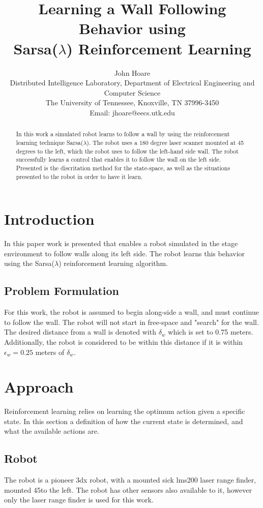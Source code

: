 \documentclass[letterpaper, 10 pt, conference]{ieeeconf}  %
\title{\LARGE \bf Learning a Wall Following Behavior using\\ Sarsa($\lambda$) Reinforcement Learning}
\author{John Hoare\\%
Distributed Intelligence Laboratory, Department of Electrical Engineering and Computer Science\\
The University of Tennessee, Knoxville, TN 37996-3450\\
Email: jhoare@eecs.utk.edu
}
\begin{document}
\maketitle
\thispagestyle{empty}
\pagestyle{empty}


\begin{abstract}
In this work a simulated robot learns to follow a wall by using the reinforcement learning technique Sarsa($\lambda$). 
The robot uses a 180 degree laser scanner mounted at 45 degrees to the left, which the robot uses to follow the left-hand side wall. 
The robot successfully learns a control that enables it to follow the wall on the left side.
Presented is the discritation method for the state-space, as well as the situations presented to the robot in order to have it learn.
\end{abstract}


\section{Introduction}
In this paper work is presented that enables a robot simulated in the stage environment to follow walls along its left side. 
The robot learns this behavior using the Sarsa($\lambda$) reinforcement learning algorithm. 
\subsection{Problem Formulation}
For this work, the robot is assumed to begin along-side a wall, and must continue to follow the wall. 
The robot will not start in free-space and "search" for the wall. 
The desired distance from a wall is denoted with $\delta_w$ which is set to 0.75 meters. 
Additionally, the robot is considered to be within this distance if it is within $\epsilon_w = 0.25$ meters of $\delta_w$.

\section{Approach}
Reinforcement learning relies on learning the optimum action given a specific state. 
In this section a definition of how the current state is determined, and what the available actions are.
\subsection{Robot}
The robot is a pioneer 3dx robot, with a mounted sick lms200 laser range finder, mounted 45\textdegree to the left.
The robot has other sensors also available to it, however only the laser range finder is used for this work.
\end{document}
